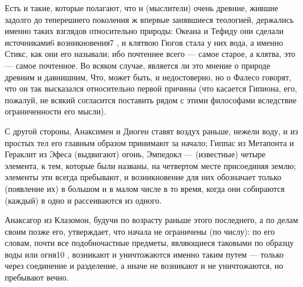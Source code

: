 \documentclass{article}
\begin{document}
Есть и такие, которые полагают, что и (мыслители) очень древние, жившие задолго до теперешнего поколения ж впервые занявшиеся теологией, держались именно таких взглядов относительно природы: Океана и Тефиду
\footnotemark[6]
они сделали источниками6  возникновения7 , и клятвою Гюгов стала у них вода, а именно Стикс, как они его называли; ибо почтеннее всего --- самое старое, а клятва, это --- самое почтенное. Во всяком случае, является ли это мнение о природе древним и давнишним, Что, может быть, и недостоверно, но о Фалесо говорят, что он так высказался относительно первой причины (что касается Гипиона,
\footnotemark[7]
его, пожалуй, не всякий согласится поставить рядом с этими философами вследствие ограниченности его мысли).

С другой стороны, Анаксимен и Диоген
\footnotemark[8]
ставят воздух раньше, нежели воду, и из простых
\footnotemark[10]
тел его главным образом принимают за начало; Гиппас из Метапонта
\footnotemark[11]
и Гераклит из Эфеса (выдвигают) огонь, Эмпедокл --- (известные) четыре элемента, к тем, которые были названы,
\footnotemark[12]
на четвертом месте присоединяя землю; элементы эти всегда пребывают, и возникновение
\footnotemark[13]
для них обозначает только (появление их) в большом и в малом
\footnotemark[9]
числе в то время, когда они собираются (каждый) в одно и рассеиваются из одного.

Анаксагор из Клазомон, будучи по возрасту раньше этого последнего, а по делам своим позже его, утверждает, что начала не ограничены (по числу): по его словам, почти все подобночастные
\footnotemark[14]
предметы, являющиеся таковыми по образцу воды или огня10 , возникают и уничтожаются именно таким путем
\footnotemark[14]
 --- только через соединение и разделение, а иначе не возникают и не уничтожаются, но пребывают вечно.
\end{document}
